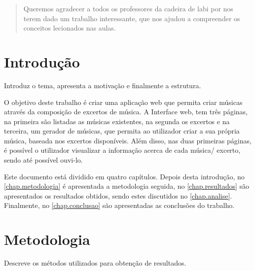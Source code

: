 \documentclass{report}
\begin{document}
\renewcommand{\abstractname}{Agradecimentos}
\begin{abstract}
Queremos agradecer a todos os professores da cadeira de \ac{labi} por nos terem
dado um trabalho interessante, que nos ajudou a compreender os conceitos
lecionados nas aulas.
\end{abstract}


\tableofcontents


\clearpage
{}


\chapter{Introdução}
\label{chap.introducao}

Introduz o tema, apresenta a motivação e finalmente a estrutura.

O objetivo deste trabalho é criar uma aplicação web que permita criar músicas através da 
composição de excertos de música. A Interface web, tem três páginas, na primeira são 
listadas as músicas existentes, na segunda os excertos e na terceira, um gerador de 
músicas, que permita ao utilizador criar a sua própria música, baseada nos excertos 
disponíveis. Além disso, nas duas primeiras páginas, é possível o utilizador visualizar a
informação acerca de cada música/ excerto, sendo até possível ouvi-lo.

Este documento está dividido em quatro capítulos.
Depois desta introdução,
no \autoref{chap.metodologia} é apresentada a metodologia seguida,
no \autoref{chap.resultados} são apresentados os resultados obtidos,
sendo estes discutidos no \autoref{chap.analise}.
Finalmente, no \autoref{chap.conclusao} são apresentadas
as conclusões do trabalho.


\chapter{Metodologia}
\label{chap.metodologia}
Descreve os métodos utilizados para obtenção de resultados.
\end{document}
